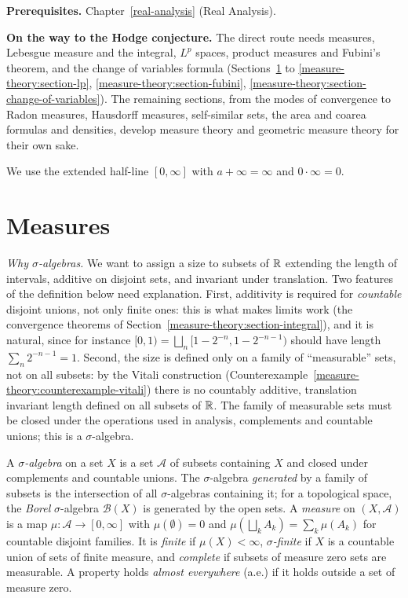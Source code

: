 \noindent\textbf{Prerequisites.} Chapter~\ref{real-analysis} (Real Analysis).

\noindent\textbf{On the way to the Hodge conjecture.} The direct route needs measures, Lebesgue measure and the integral, $L^p$ spaces, product measures and Fubini's theorem, and the change of
variables formula (Sections~\ref{measure-theory:section-measures} to \ref{measure-theory:section-lp}, \ref{measure-theory:section-fubini}, \ref{measure-theory:section-change-of-variables}). The remaining sections, from the modes of convergence to Radon measures, Hausdorff measures,
self-similar sets, the area and coarea formulas and densities, develop measure theory and geometric measure theory for their own sake.

We use the extended half-line $[0, \infty]$ with $a + \infty = \infty$ and $0 \cdot \infty = 0$.

\section{Measures}\label{measure-theory:section-measures}

\emph{Why $\sigma$-algebras.} We want to assign a size to subsets of $\mathbb{R}$ extending the length of intervals, additive on disjoint sets, and invariant under translation. Two features of the
definition below need explanation. First, additivity is required for \emph{countable} disjoint unions, not only finite ones: this is what makes limits work (the convergence theorems of
Section~\ref{measure-theory:section-integral}), and it is natural, since for instance $[0, 1) = \bigsqcup_n[1 - 2^{-n}, 1 - 2^{-n-1})$ should have length $\sum_n2^{-n-1} = 1$. Second, the size is defined only
on a family of ``measurable'' sets, not on all subsets: by the Vitali construction (Counterexample~\ref{measure-theory:counterexample-vitali}) there is no countably additive, translation invariant length
defined on all subsets of $\mathbb{R}$. The family of measurable sets must be closed under the operations used in analysis, complements and countable unions; this is a $\sigma$-algebra.

\begin{definition}\label{measure-theory:definition-measure}
A \emph{$\sigma$-algebra} on a set $X$ is a set $\mathcal{A}$ of subsets containing $X$ and closed under complements and countable unions. The $\sigma$-algebra \emph{generated} by a family of
subsets is the intersection of all $\sigma$-algebras containing it; for a topological space, the \emph{Borel} $\sigma$-algebra $\mathcal{B}(X)$ is generated by the open sets. A \emph{measure} on
$(X, \mathcal{A})$ is a map $\mu \colon \mathcal{A} \to [0, \infty]$ with $\mu(\emptyset) = 0$ and $\mu(\bigsqcup_k A_k) = \sum_k\mu(A_k)$ for countable disjoint families. It is \emph{finite} if
$\mu(X) < \infty$, \emph{$\sigma$-finite} if $X$ is a countable union of sets of finite measure, and \emph{complete} if subsets of measure zero sets are measurable. A property holds
\emph{almost everywhere} (a.e.) if it holds outside a set of measure zero.
\end{definition}


